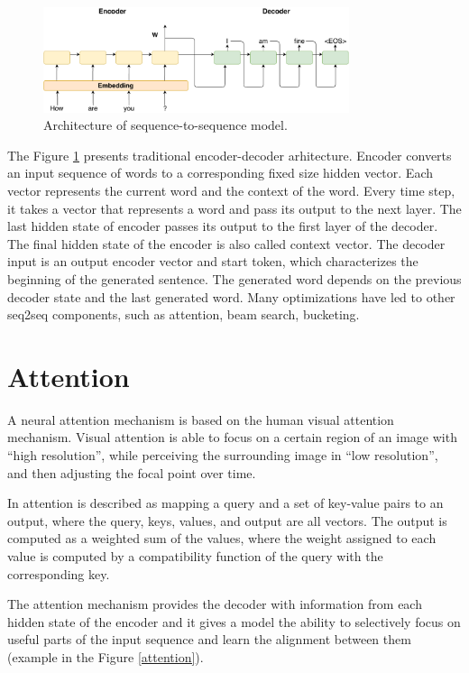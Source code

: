 \begin{figure}[hbt]
  \centering
  \includegraphics[width=0.8\textwidth]{figures/encoder_decoder.pdf}
  \caption{Architecture of sequence-to-sequence model.}
  \label{encoder_decoder}
\end{figure}

The Figure \ref{encoder_decoder} presents traditional encoder-decoder arhitecture. Encoder converts an input sequence of words to a corresponding fixed size hidden vector. Each vector represents the current word and the context of the word. Every time step, it takes a vector that represents a word and pass its output to the next layer. The last hidden state of encoder passes its output to the first layer of the decoder. The final hidden state of the encoder is also called context vector. The decoder input is an output encoder vector and start token, which characterizes the beginning of the generated sentence. The generated word depends on the previous decoder state and the last generated word. Many optimizations have led to other seq2seq components, such as attention, beam search, bucketing.

\section{Attention}
A neural attention mechanism is based on the human visual attention mechanism. Visual attention is able to focus on a certain region of an image with ``high resolution'', while perceiving the surrounding image in “low resolution”, and then adjusting the focal point over time.

In \cite{vaswani2017attention} attention is described as mapping a query and a set of key-value pairs to an output, where the query, keys, values, and output are all vectors. The output is computed as a weighted sum of the values, where the weight assigned to each value is computed by a compatibility function of the query with the corresponding key.

The attention mechanism provides the decoder with information from each hidden state of the encoder and it gives a model the ability to selectively focus on useful parts of the input sequence and learn the alignment between them (example in the Figure \ref{attention}).

